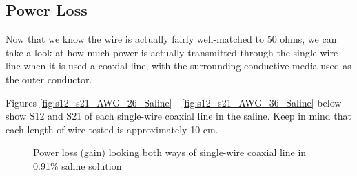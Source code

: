 \documentclass[12pt,onecolumn,titlepage]{article}
\begin{document}
\subsection{Power Loss}
\indent \indent Now that we know the wire is actually fairly well-matched to 50 ohms, we can take a look at how much power is actually transmitted through the single-wire line when it is used a coaxial line, with the surrounding conductive media used as the outer conductor. 

Figures \ref{fig:s12_s21_AWG_26_Saline} - \ref{fig:s12_s21_AWG_36_Saline} below show S12 and S21 of each single-wire coaxial line in the saline. Keep in mind that each length of wire tested is approximately 10 cm.



\begin{figure}[htbp]
	\centering
		\quad
		\quad
	\label{fig:s12_s21_Saline}
	\caption{Power loss (gain) looking both ways of single-wire coaxial line in 0.91\% saline solution}
\end{figure}
\end{document}
